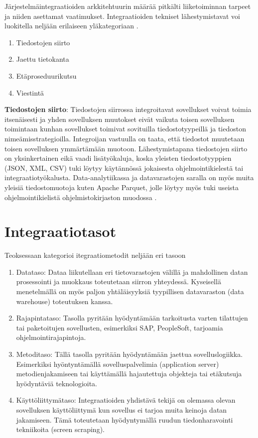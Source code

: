 Järjestelmäintegraatioiden arkkitehtuurin määrää pitkälti liiketoiminnan tarpeet ja niiden asettamat vaatimukset. Integraatioiden tekniset lähestymistavat voi luokitella neljään erilaiseen yläkategoriaan \citep[sivu~64]{Hohpe2004}.

\begin{enumerate}
   \item Tiedostojen siirto
   \item Jaettu tietokanta
   \item Etäproseduurikutsu
   \item Viestintä
   
\end{enumerate}

\textbf{Tiedostojen siirto}: Tiedostojen siirrossa integroitavat sovellukset voivat toimia itsenäisesti ja yhden sovelluksen muutokset eivät vaikuta toisen sovelluksen toimintaan kunhan sovellukset toimivat sovituilla tiedostotyypeillä ja tiedoston nimeämisstrategioilla. Integroijan vastuulla on taata, että tiedostot muutetaan toisen sovelluksen ymmärtämään muotoon. Lähestymistapana tiedostojen siirto on yksinkertainen eikä vaadi lisätyökaluja, koska yleisten tiedostotyyppien (JSON, XML, CSV) tuki löytyy käytännössä jokaisesta ohjelmointikielestä tai integraatiotyökalusta.
Data-analytiikassa ja datavarastojen saralla on myös muita yleisiä tiedostomuotoja kuten Apache Parquet, jolle löytyy myös tuki useista ohjelmointikielistä ohjelmistokirjaston muodossa \citep{Parquet}.


\section{Integraatiotasot}

Teoksessaan \citep{linthicum2000enterprise} kategorioi itegraatiometodit neljään eri tasoon

\begin{enumerate}
   \item Datataso: Dataa liikutellaan eri tietovarastojen välillä ja mahdollinen datan prosessointi ja muokkaus toteutetaan siirron yhteydessä. Kyseisellä menetelmällä on myös paljon yhtäläisyyksiä tyypillisen datavaraston (data warehouse) toteutuksen kanssa.
   \item Rajapintataso: Tasolla pyritään hyödyntämään tarkoitusta varten tilattujen tai paketoitujen sovellusten, esimerkiksi SAP, PeopleSoft, tarjoamia ohjelmointirajapintoja.
   \item Metoditaso: Tällä tasolla pyritään hyödyntämään jaettua sovelluslogiikka. Esimerkiksi hyöntyntämällä sovelluspalvelimia (application server) metodienjakamiseen tai käyttämällä hajautettuja objekteja tai etäkutsuja hyödyntäviä teknologioita.
   \item Käyttöliittymätaso: Integraatioiden yhdistävä tekijä on olemassa olevan sovelluksen käyttöliittymä kun sovellus ei tarjoa muita keinoja datan jakamiseen. Tämä toteutetaan hyödyntymällä ruudun tiedonharavointi tekniikoita (screen scraping). \citep{linthicum2000enterprise}
   
\end{enumerate}


